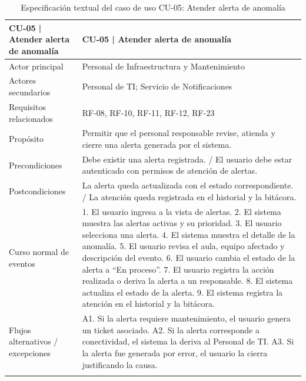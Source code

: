 \begingroup
\small
\begin{longtable}{|p{7.8cm}|p{7.8cm}|}
\hline
CU-05 | Atender alerta de anomalía & CU-05 | Atender alerta de anomalía \\ \hline
Actor principal & Personal de Infraestructura y Mantenimiento \\ \hline
Actores secundarios & Personal de TI; Servicio de Notificaciones \\ \hline
Requisitos relacionados & RF-08, RF-10, RF-11, RF-12, RF-23 \\ \hline
Propósito & Permitir que el personal responsable revise, atienda y cierre una alerta generada por el sistema. \\ \hline
Precondiciones & Debe existir una alerta registrada. / El usuario debe estar autenticado con permisos de atención de alertas. \\ \hline
Postcondiciones & La alerta queda actualizada con el estado correspondiente. / La atención queda registrada en el historial y la bitácora. \\ \hline
Curso normal de eventos & 1. El usuario ingresa a la vista de alertas. 2. El sistema muestra las alertas activas y su prioridad. 3. El usuario selecciona una alerta. 4. El sistema muestra el detalle de la anomalía. 5. El usuario revisa el aula, equipo afectado y descripción del evento. 6. El usuario cambia el estado de la alerta a ``En proceso''. 7. El usuario registra la acción realizada o deriva la alerta a un responsable. 8. El sistema actualiza el estado de la alerta. 9. El sistema registra la atención en el historial y la bitácora. \\ \hline
Flujos alternativos / excepciones & A1. Si la alerta requiere mantenimiento, el usuario genera un ticket asociado. A2. Si la alerta corresponde a conectividad, el sistema la deriva al Personal de TI. A3. Si la alerta fue generada por error, el usuario la cierra justificando la causa. \\ \hline
\caption{Especificación textual del caso de uso CU-05: Atender alerta de anomalía}
\end{longtable}
\endgroup

